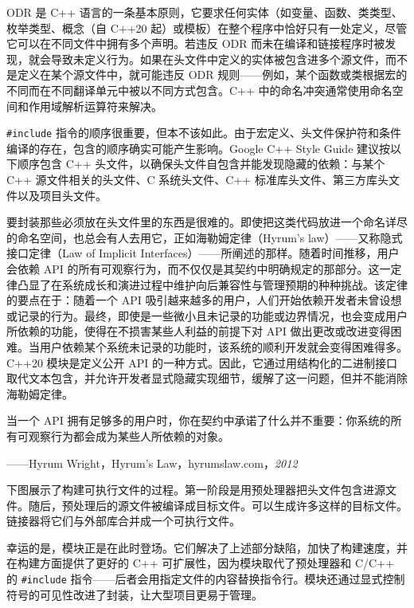ODR 是 C++ 语言的一条基本原则，它要求任何实体（如变量、函数、类类型、枚举类型、概念（自 C++20 起）或模板）在整个程序中恰好只有一处定义，尽管它可以在不同文件中拥有多个声明。若违反 ODR 而未在编译和链接程序时被发现，就会导致未定义行为。如果在头文件中定义的实体被包含进多个源文件，而不是定义在某个源文件中，就可能违反 ODR 规则——例如，某个函数或类根据宏的不同而在不同翻译单元中被以不同方式包含。C++ 中的命名冲突通常使用命名空间和作用域解析运算符来解决。

\texttt{\#include} 指令的顺序很重要，但本不该如此。由于宏定义、头文件保护符和条件编译的存在，包含的顺序确实可能产生影响。Google C++ Style Guide 建议按以下顺序包含 C++ 头文件，以确保头文件自包含并能发现隐藏的依赖：与某个 C++ 源文件相关的头文件、C 系统头文件、C++ 标准库头文件、第三方库头文件以及项目头文件。

\label{idx:748}
要封装那些必须放在头文件里的东西是很难的。即使把这类代码放进一个命名详尽的命名空间，也总会有人去用它，正如海勒姆定律（Hyrum's law）——又称隐式接口定律（Law of Implicit Interfaces）——所阐述的那样。随着时间推移，用户会依赖 API 的所有可观察行为，而不仅仅是其契约中明确规定的那部分。这一定律凸显了在系统成长和演进过程中维护向后兼容性与管理预期的种种挑战。该定律的要点在于：随着一个 API 吸引越来越多的用户，人们开始依赖开发者未曾设想或记录的行为。最终，即使是一些微小且未记录的功能或边界情况，也会变成用户所依赖的功能，使得在不损害某些人利益的前提下对 API 做出更改或改进变得困难。当用户依赖某个系统未记录的功能时，该系统的顺利开发就会变得困难得多。C++20 模块是定义公开 API 的一种方式。因此，它通过用结构化的二进制接口取代文本包含，并允许开发者显式隐藏实现细节，缓解了这一问题，但并不能消除海勒姆定律。

\begin{myQuote}
当一个 API 拥有足够多的用户时，你在契约中承诺了什么并不重要：你系统的所有可观察行为都会成为某些人所依赖的对象。

——Hyrum Wright，Hyrum's Law，hyrumslaw.com，\emph{2012}

\end{myQuote}

下图展示了构建可执行文件的过程。第一阶段是用预处理器把头文件包含进源文件。随后，预处理后的源文件被编译成目标文件。可以生成许多这样的目标文件。链接器将它们与外部库合并成一个可执行文件。


幸运的是，模块正是在此时登场。它们解决了上述部分缺陷，加快了构建速度，并在构建方面提供了更好的 C++ 可扩展性，因为模块取代了预处理器和 C/C++ 的 \texttt{\#include} 指令——后者会用指定文件的内容替换指令行。模块还通过显式控制符号的可见性改进了封装，让大型项目更易于管理。

